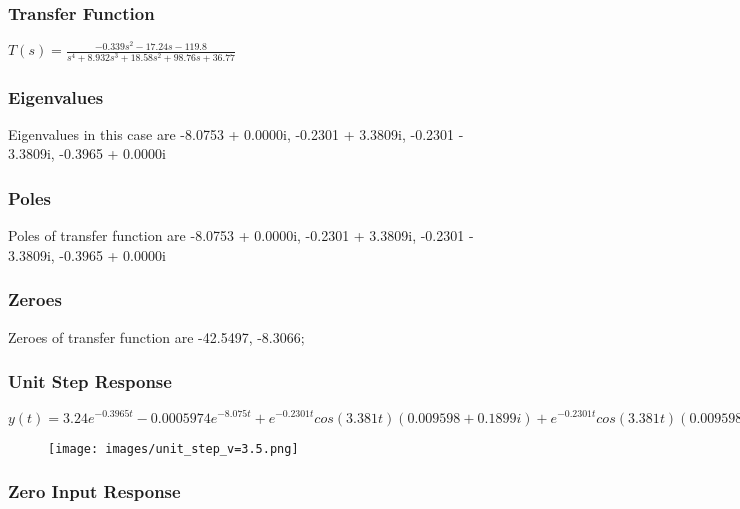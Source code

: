 \documentclass[notitlepage]{article}
\begin{document}
\subsubsection{Transfer Function}
$T(s) = \frac{  -0.339 s^2 - 17.24 s - 119.8}{s^4 + 8.932 s^3 + 18.58 s^2 + 98.76 s + 36.77}$
\subsubsection{Eigenvalues} 
Eigenvalues in this case are -8.0753 + 0.0000i, -0.2301 + 3.3809i, 
 -0.2301 - 3.3809i, -0.3965 + 0.0000i
\subsubsection{Poles}
Poles of transfer function are  -8.0753 + 0.0000i, -0.2301 + 3.3809i, -0.2301 - 3.3809i, -0.3965 + 0.0000i

\subsubsection{Zeroes}
Zeroes of transfer function are   -42.5497, -8.3066;
\vspace{2 mm}

\newpage
\subsubsection{Unit Step Response}
$y(t)=3.24e^{-0.3965t} - 0.0005974e^{-8.075t} + e^{-0.2301t}cos(3.381t)(0.009598 + 0.1899i) + e^{-0.2301t}cos(3.381t)(0.009598 - 0.1899i) + e^{-0.2301t}sin(3.381t)(0.1899 - 0.009598i) + e^{-0.2301t}sin(3.381t)(0.1899 + 0.009598i) - 3.259
 $
\begin{figure}[!h]
    \centering
    \texttt{[image: images/unit\_step\_v=3.5.png]}
    \label{fig:my_label}
\end{figure}

\newpage
\subsubsection{Zero Input Response}
\vspace{1mm}
\end{document}
